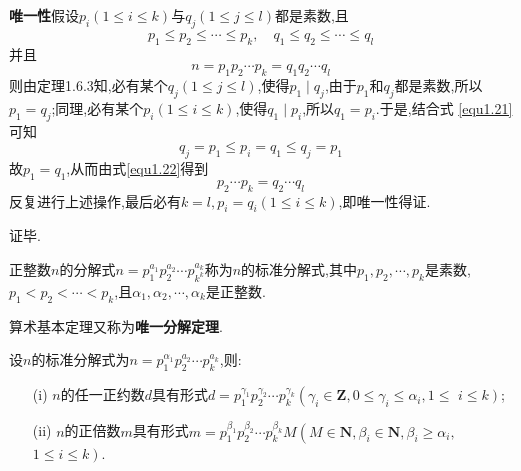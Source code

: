 \textbf{唯一性}\quad 假设$p_{i}(1 \leqslant i \leqslant k)$与$q_{j}(1 \leqslant j \leqslant l)$都是素数,且
\begin{equation}\label{equ1.21}
	p_{1} \leqslant p_{2} \leqslant \cdots \leqslant p_{k}, \quad q_{1} \leqslant q_{2} \leqslant \cdots \leqslant q_{l}
\end{equation}
并且
\begin{equation}\label{equ1.22}
	n=p_{1} p_{2} \cdots p_{k}=q_{1} q_{2} \cdots q_{l}
\end{equation}
则由定理1.6.3知,必有某个$q_{j}(1 \leqslant j \leqslant l)$,使得$p_{1} \mid q_{j}$,由于$p_{1}$和$q_{j}$都是素数,所以 $p_{1}=q_{j}$;同理,必有某个$p_{i}(1 \leqslant i \leqslant k)$,使得$q_{1} \mid p_{i}$,所以$q_{1}=p_{i}$.于是,结合式 \eqref{equ1.21}可知
\begin{equation*}
	q_{j}=p_{1} \leqslant p_{i}=q_{1} \leqslant q_{j}=p_{1}
\end{equation*}
故$p_{1}=q_{1}$,从而由式\eqref{equ1.22}得到
\begin{equation*}
	p_{2} \cdots p_{k}=q_{2} \cdots q_{l}
\end{equation*}
反复进行上述操作,最后必有$k=l, p_{i}=q_{i}(1 \leqslant i \leqslant k)$,即唯一性得证.

证毕.

 正整数$n$的分解式$n=p_{1}^{a_{1}} p_{2}^{a_{2}} \cdots p_{k^{k}}^{a_{k}}$称为$n$的标准分解式,其中$p_{1}, p_{2}, \cdots, p_{k}$是素数,$p_{1}<p_{2}<\cdots<p_{k}$,且$\alpha_{1}, \alpha_{2}, \cdots, \alpha_{k}$是正整数.

\remark 算术基本定理又称为\textbf{唯一分解定理}.

\corollary {\color{red}[推论1.7.1]}设$n$的标准分解式为$n=p_{1}^{\alpha_{1}} p_{2}^{a_{2}} \cdots p_{k}^{a_{k}}$,则:
\begin{enumerate}
	\item[(i)] $n$的任一正约数$d$具有形式$d=p_{1}^{\gamma_{1}} p_{2}^{\gamma_{2}} \cdots p_{k}^{\gamma_{k}}\left(\gamma_{i} \in \mathbf{Z}, 0 \leqslant \gamma_{i} \leqslant \alpha_{i}, 1 \leqslant  \right.$ $\left.i\leqslant k\right)$;
	\item[(ii)] $n$的正倍数$m$具有形式$m=p_{1}^{\beta_{1}} p_{2}^{\beta_{2}} \cdots p_{k}^{\beta_{k}} M\left(M \in \mathbf{N}, \beta_{i} \in \mathbf{N}, \beta_{i} \geqslant \alpha_{i},\right.$ $\left. 1 \leqslant i \leqslant k\right)$.
\end{enumerate}

